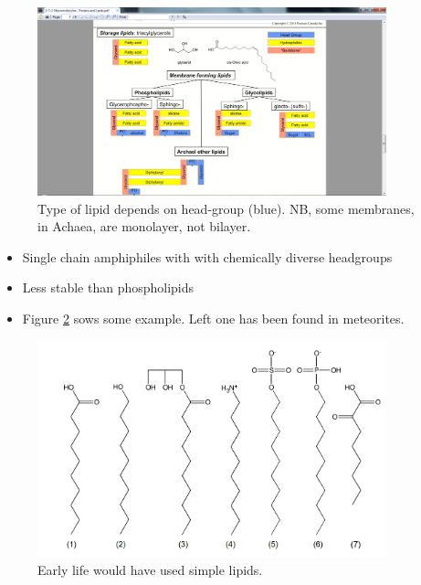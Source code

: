 \documentclass[]{article}
\begin{document}
\begin{figure}[H]
	\caption[Type of lipid depends on head-group]{Type of lipid depends on head-group (blue). NB, some membranes, in Achaea, are monolayer, not bilayer.}\label{fig:LipidTypes} 
	\includegraphics[width=0.9\textwidth]{LipidTypes}
\end{figure}

\begin{itemize}
	\item Single chain amphiphiles with with chemically
	diverse headgroups
	\item Less stable than phospholipids
	\item Figure \ref{fig:SimplerLipids} sows some example. Left one has been found in meteorites.
\end{itemize}
\begin{figure}[H]
	\caption{Early life would have used simple lipids.}\label{fig:SimplerLipids} 
	\includegraphics[width=0.9\textwidth]{SimplerLipids}
\end{figure}
\end{document}
